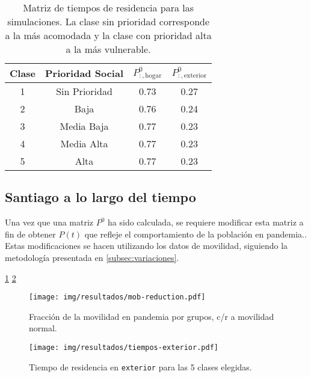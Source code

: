 \begin{table}[h!]
\centering
\begin{tabular}{||c c | c c ||} 
 \hline
 \textbf{Clase} & \textbf{Prioridad Social} &  \(P^0_{:,\text{hogar}}\) & \(P^0_{:,\text{exterior}}\)\\[1ex] 
 \hline
 1 & Sin Prioridad  & 0.73  & 0.27 \\ 
 2 & Baja           & 0.76  & 0.24 \\
 3 & Media Baja     & 0.77  & 0.23 \\
 4 & Media Alta     & 0.77  & 0.23 \\
 5 & Alta           & 0.77  & 0.23 \\ 
 \hline
\end{tabular}
\caption[Matriz de tiempos de residencia para las simulaciones.]{Matriz de tiempos de residencia para las simulaciones. La clase sin prioridad corresponde a la más acomodada y la clase con prioridad alta a la más vulnerable.}
\label{table:matrix-simulaciones}
\end{table}

\subsection{Santiago a lo largo del tiempo} \label{res:matrix-pandemia}

Una vez que una matriz \(P^0\) ha sido calculada, se requiere modificar esta matriz a fin de obtener \(P(t)\) que refleje el comportamiento de la población en pandemia.. Estas modificaciones se hacen utilizando los datos de movilidad, siguiendo la metodología presentada en \ref{subsec:variaciones}.

\ref{img:mov-pandemia}
\ref{img:Pmatrix-pandemia-exterior}

\begin{figure}[!h]
\centering
\texttt{[image: img/resultados/mob-reduction.pdf]}
\caption{Fracción de la movilidad en pandemia por grupos, c/r a movilidad normal.}
\label{img:mov-pandemia}
\end{figure}

\begin{figure}[!h]
\centering
\texttt{[image: img/resultados/tiempos-exterior.pdf]}
\caption[Tiempo de residencia en \texttt{exterior} para las 5 clases elegidas.]{Tiempo de residencia en \texttt{exterior} para las 5 clases elegidas.}
\label{img:Pmatrix-pandemia-exterior}
\end{figure}





